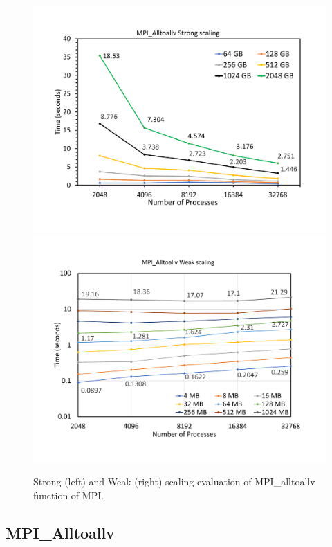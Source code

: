 \begin{figure}[t]
	{\includegraphics[width=.50\textwidth,  trim={0cm 0cm 0cm 0cm, 
			clip}]{results/all_to_all_strong.pdf}}\hfill%
	{\includegraphics[width=.50\textwidth,  trim={0cm 0cm 0cm 0cm,
			clip}]{results/all_to_all_weak.pdf}}\hfill%
	\centering
	\caption{Strong (left) and Weak (right) scaling evaluation of MPI\_alltoallv function of MPI. }
	\label{fig:all_to_all}
\end{figure}


\subsection{MPI\_Alltoallv}
\label{sec:all_to_all}


